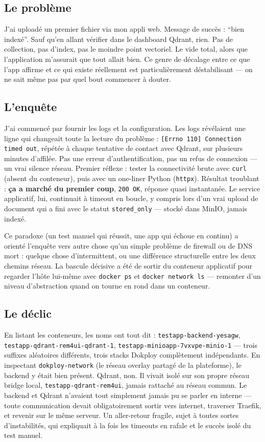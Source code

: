 \documentclass[10pt,twoside,openany]{article}
\begin{document}
\subsection*{Le problème}
J'ai uploadé un premier fichier via mon appli web. Message de succès : \enquote{bien indexé}. Sauf qu'en allant vérifier dans le dashboard Qdrant, rien. Pas de collection, pas d'index, pas le moindre point vectoriel. Le vide total, alors que l'application m'assurait que tout allait bien. Ce genre de décalage entre ce que l'app affirme et ce qui existe réellement est particulièrement déstabilisant — on ne sait même pas par quel bout commencer à douter.

\subsection*{L'enquête}
J'ai commencé par fournir les logs et la configuration. Les logs révélaient une ligne qui changeait toute la lecture du problème : \texttt{[Errno 110] Connection timed out}, répétée à chaque tentative de contact avec Qdrant, sur plusieurs minutes d'affilée. Pas une erreur d'authentification, pas un refus de connexion — un vrai silence réseau. Premier réflexe : tester la connectivité brute avec \texttt{curl} (absent du conteneur), puis avec un one-liner Python (\texttt{httpx}). Résultat troublant : \textbf{ça a marché du premier coup}, \texttt{200 OK}, réponse quasi instantanée. Le service applicatif, lui, continuait à timeout en boucle, y compris lors d'un vrai upload de document qui a fini avec le statut \texttt{stored\_only} — stocké dans MinIO, jamais indexé.

Ce paradoxe (un test manuel qui réussit, une app qui échoue en continu) a orienté l'enquête vers autre chose qu'un simple problème de firewall ou de DNS mort : quelque chose d'intermittent, ou une différence structurelle entre les deux chemins réseau. La bascule décisive a été de sortir du conteneur applicatif pour regarder l'hôte lui-même avec \texttt{docker ps} et \texttt{docker network ls} — remonter d'un niveau d'abstraction quand on tourne en rond dans un conteneur.

\subsection*{Le déclic}
En listant les conteneurs, les noms ont tout dit : \texttt{testapp-backend-yesagw}, \texttt{testapp-qdrant-rem4ui-qdrant-1}, \texttt{testapp-minioapp-7vxvpe-minio-1} — trois suffixes aléatoires différents, trois stacks Dokploy complètement indépendants. En inspectant \texttt{dokploy-network} (le réseau overlay partagé de la plateforme), le backend y était bien présent. Qdrant, non. Il vivait isolé sur son propre réseau bridge local, \texttt{testapp-qdrant-rem4ui}, jamais rattaché au réseau commun. Le backend et Qdrant n'avaient tout simplement jamais pu se parler en interne — toute communication devait obligatoirement sortir vers internet, traverser Traefik, et revenir sur le même serveur. Un aller-retour fragile, sujet à toutes sortes d'instabilités, qui expliquait à la fois les timeouts en rafale et le succès isolé du test manuel.
\end{document}
